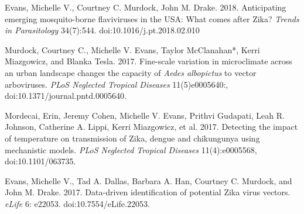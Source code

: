 \begin{etaremune}
\item \textcolor{awesome}{Evans, Michelle V.}, Courtney C. Murdock, John M. Drake. 2018. Anticipating emerging mosquito-borne flaviviruses in the USA: What comes after Zika? \textit{Trends in Parasitology} 34(7):544. \linebreak doi:10.1016/j.pt.2018.02.010

\item Murdock, Courtney C., \textcolor{awesome}{Michelle V. Evans}, Taylor McClanahan*, Kerri Miazgowicz, and Blanka Tesla. 2017. Fine-scale variation in microclimate across an urban landscape changes the capacity of \textit{Aedes albopictus} to vector arboviruses. \textit{PLoS Neglected Tropical Diseases} 11(5)e0005640:, \linebreak doi:10.1371/journal.pntd.0005640.
\smallskip

\item Mordecai, Erin, Jeremy Cohen, \textcolor{awesome}{Michelle V. Evans}, Prithvi Gudapati, Leah R. Johnson, Catherine A. Lippi, Kerri Miazgowicz, et al. 2017. Detecting the impact of temperature on transmission of Zika, dengue and chikungunya using mechanistic models. \textit{PLoS Neglected Tropical Diseases} 11(4):e0005568, \linebreak doi:10.1101/063735.
\smallskip

\item \textcolor{awesome}{Evans, Michelle V.}, Tad A. Dallas, Barbara A. Han, Courtney C. Murdock, and John M. Drake. 2017. Data-driven identification of potential Zika virus vectors. \textit{eLife} 6: e22053. doi:10.7554/eLife.22053.

\end{etaremune}

\bigskip
